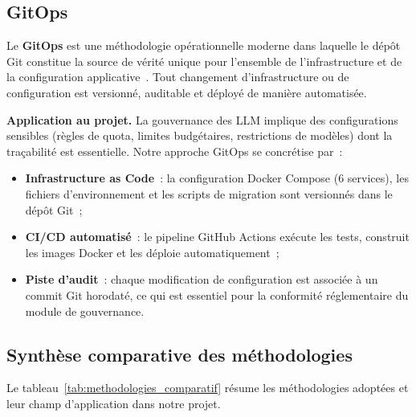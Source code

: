 \subsection{GitOps}

Le \textbf{GitOps} est une méthodologie opérationnelle moderne dans laquelle le dépôt Git constitue la \og source de vérité unique \fg{} pour l'ensemble de l'infrastructure et de la configuration applicative~\cite{limoncelli2014}. Tout changement d'infrastructure ou de configuration est versionné, auditable et déployé de manière automatisée.

\textbf{Application au projet.} La gouvernance des LLM implique des configurations sensibles (règles de quota, limites budgétaires, restrictions de modèles) dont la traçabilité est essentielle. Notre approche GitOps se concrétise par~:

\begin{itemize}[noitemsep]
    \item \textbf{Infrastructure as Code}~: la configuration Docker Compose (6 services), les fichiers d'environnement et les scripts de migration sont versionnés dans le dépôt Git~;
    \item \textbf{CI/CD automatisé}~: le pipeline GitHub Actions exécute les tests, construit les images Docker et les déploie automatiquement~;
    \item \textbf{Piste d'audit}~: chaque modification de configuration est associée à un commit Git horodaté, ce qui est essentiel pour la conformité réglementaire du module de gouvernance.
\end{itemize}


\subsection{Synthèse comparative des méthodologies}

Le tableau~\ref{tab:methodologies_comparatif} résume les méthodologies adoptées et leur champ d'application dans notre projet.

